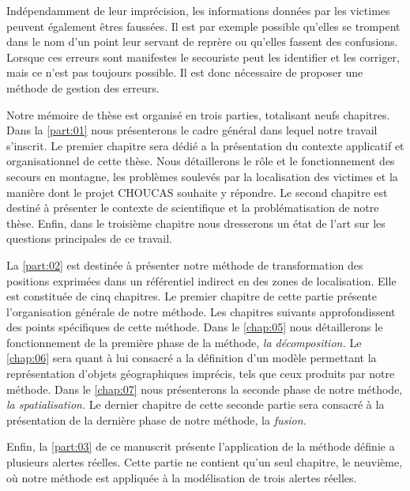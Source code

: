 Indépendamment de leur imprécision, les informations données par les
victimes peuvent également êtres faussées. Il est par exemple possible
qu'elles se trompent dans le nom d'un point leur servant de reprère ou
qu'elles fassent des confusions. Lorsque ces erreurs sont manifestes
le secouriste peut les identifier et les corriger, mais ce n'est pas
toujours possible. Il est donc nécessaire de proposer une méthode de
gestion des erreurs.



Notre mémoire de thèse est organisé en trois parties, totalisant neufs
chapitres. Dans la \autoref{part:01} nous présenterons le cadre
général dans lequel notre travail s'inscrit. Le premier chapitre sera
dédié a la présentation du contexte applicatif et organisationnel de
cette thèse. Nous détaillerons le rôle et le fonctionnement des
secours en montagne, les problèmes soulevés par la localisation des
victimes et la manière dont le projet CHOUCAS souhaite y répondre. Le
second chapitre est destiné à présenter le contexte de scientifique et
la problématisation de notre thèse. Enfin, dans le troisième chapitre
nous dresserons un état de l'art sur les questions principales de ce
travail.

La \autoref{part:02} est destinée à présenter notre méthode de
transformation des positions exprimées dans un référentiel indirect en
des zones de localisation. Elle est constituée de cinq chapitres. Le
premier chapitre de cette partie présente l’organisation générale de
notre méthode. Les chapitres suivants approfondissent des points
spécifiques de cette méthode. Dans le \autoref{chap:05} nous
détaillerons le fonctionnement de la première phase de la méthode,
\emph{la décomposition.} Le \autoref{chap:06} sera quant à lui
consacré a la définition d'un modèle permettant la représentation
d'objets géographiques imprécis, tels que ceux produits par notre
méthode. Dans le \autoref{chap:07} nous présenterons la seconde phase
de notre méthode, \emph{la spatialisation.} Le dernier chapitre de
cette seconde partie sera consacré à la présentation de la dernière
phase de notre méthode, la \emph{fusion.}

Enfin, la \autoref{part:03} de ce manuscrit présente l’application de
la méthode définie a plusieurs alertes réelles. Cette partie ne
contient qu'un seul chapitre, le neuvième, où notre méthode est
appliquée à la modélisation de trois alertes réelles.



